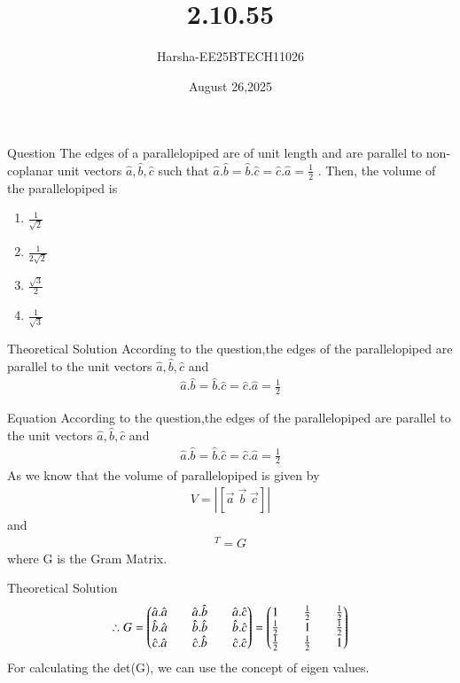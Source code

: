 \documentclass{beamer}
\title %
{2.10.55}
\date{August 26,2025}
\author %
{Harsha-EE25BTECH11026}
\begin{document}
\frame{\titlepage}
\begin{frame}{Question}
The edges of a parallelopiped are of unit length and are parallel to non-coplanar unit vectors $\hat{a},\hat{b},\hat{c}$ such that $\hat{a}.\hat{b}=\hat{b}.\hat{c}=\hat{c}.\hat{a}=\frac{1}{2}$ . Then, the volume of the parallelopiped is

\begin{enumerate}
    \item $\frac{1}{\sqrt{2}}$
    \item $\frac{1}{2\sqrt{2}}$
    \item $\frac{\sqrt{3}}{2}$
    \item $\frac{1}{\sqrt{3}}$
\end{enumerate}
\end{frame}



\begin{frame}{Theoretical Solution}
According to the question,the edges of the parallelopiped are parallel to the unit vectors $\hat{a},\hat{b},\hat{c}$ and\\
\begin{align}
    \hat{a}.\hat{b}=\hat{b}.\hat{c}=\hat{c}.\hat{a}=\frac{1}{2}
\end{align}
\end{frame}

\begin{frame}{Equation}
According to the question,the edges of the parallelopiped are parallel to the unit vectors $\hat{a},\hat{b},\hat{c}$ and\\
\begin{align*}
    \hat{a}.\hat{b}=\hat{b}.\hat{c}=\hat{c}.\hat{a}=\frac{1}{2}
\end{align*}
As we know that the volume of parallelopiped is given by
\begin{align*}
    V=|[\vec{a}\;\vec{b}\;\vec{c}]|
\end{align*}
and
\begin{align*}
    [\vec{a}\;\vec{b}\;\vec{c}][\vec{a}\;\vec{b}\;\vec{c}]^T=G
\end{align*}
where G is the Gram Matrix.
\end{frame}

\begin{frame}{Theoretical Solution}
\begin{align*}
    \therefore G=\begin{pmatrix}\hat{a}.\hat{a}&&\hat{a}.\hat{b}&&\hat{a}.\hat{c} \\ \hat{b}.\hat{a}&& \hat{b}.\hat{b}&& \hat{b}.\hat{c} \\ \hat{c}.\hat{a}&& \hat{c}.\hat{b}&& \hat{c}.\hat{c}\end{pmatrix}=\begin{pmatrix}1&&\frac{1}{2}&&\frac{1}{2}\\ \frac{1}{2}&&1&&\frac{1}{2}\\ \frac{1}{2}&&\frac{1}{2}&&1\end{pmatrix}
\end{align*}
For calculating the det(G), we can use the concept of eigen values.
\end{frame}
\end{document}

